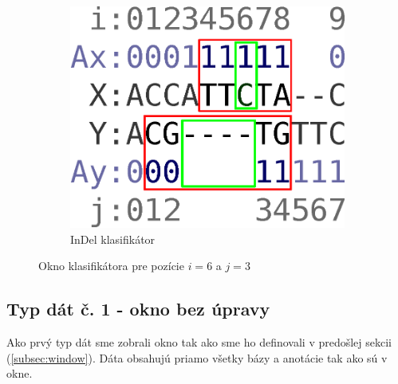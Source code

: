 \begin{figure}[h]
\begin{subfigure}[b]{0.35\textwidth}
                \includegraphics[width=\textwidth]{images/window_i}
                \caption{InDel klasifikátor}
                \label{fig:window-i}
        \end{subfigure}
        \caption[Okno klasifikátora]{Okno klasifikátora pre pozície $i = 6$ a $j = 3$}
\end{figure}


\subsection{Typ dát č. 1 - okno bez úpravy}
\label{subsec:datatype1}

Ako prvý typ dát sme zobrali okno tak ako sme ho definovali v predošlej sekcii (\ref{subsec:window}). Dáta obsahujú priamo všetky bázy a anotácie tak ako sú v okne.

